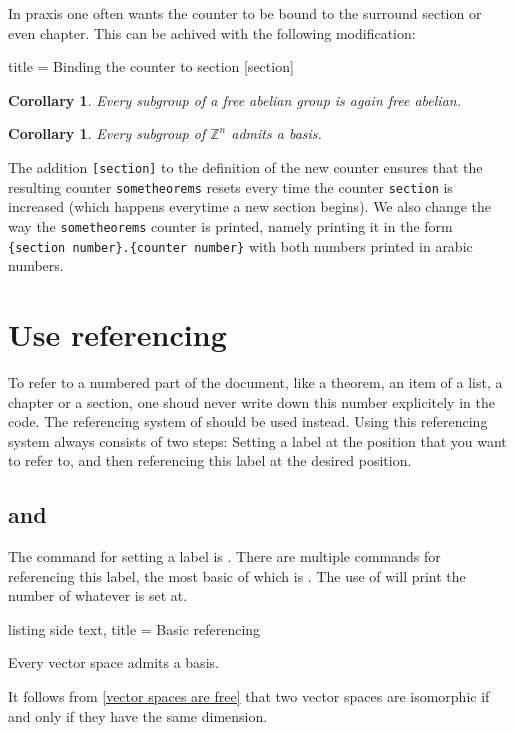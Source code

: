 \documentclass[a4paper, 10pt, headings=standardclasses, oneside, bibliography=totocnumbered]{scrbook}
\begin{document}
In praxis one often wants the counter to be bound to the surround section or even chapter.
This can be achived with the following modification:
\begin{tcblisting}{title = {Binding the counter to section}}
[section]
\renewcommand{\thesometheorems}{\arabic{section}.\arabic{sometheorems}}
\newtheorem{corollary}[sometheorems]{Corollary}

\begin{corollary}
  Every subgroup of a free abelian group is again free abelian.
\end{corollary}

\begin{corollary}
  Every subgroup of $\mathbb{Z}^n$ admits a basis.
\end{corollary}

\end{tcblisting}
The addition \texttt{[section]} to the definition of the new counter ensures that the resulting counter \texttt{sometheorems} resets every time the counter \texttt{section} is increased (which happens everytime a new section begins).
We also change the way the \texttt{sometheorems} counter is printed, namely printing it in the form \texttt{\{section number\}.\{counter number\}} with both numbers printed in arabic numbers.








\section{Use referencing}

To refer to a numbered part of the document, like a theorem, an item of a list, a chapter or a section, one shoud never write down this number explicitely in the code.
The referencing system of  should be used instead.
Using this referencing system always consists of two steps:
Setting a label at the position that you want to refer to, and then referencing this label at the desired position.



\subsection{ and }

The command for setting a label is .
There are multiple commands for referencing this label, the most basic of which is .
The use of  will print the number of whatever  is set at.
\begin{tcblisting}{listing side text, title = {Basic referencing}}
\begin{theorem}
    \label{vector spaces are free}
    Every vector space admits a basis.
\end{theorem}
It follows from \ref{vector spaces are free} that two vector spaces are isomorphic if and only if they have the same dimension.
\end{tcblisting}
\end{document}
